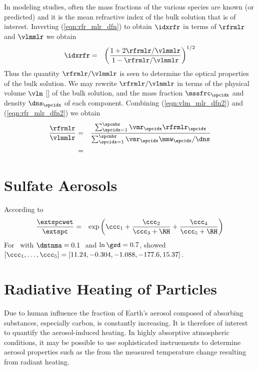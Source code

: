 \documentclass[12pt,twoside]{book}
\begin{document}
In modeling studies, often the mass fractions of the various species
are known (or predicted) and it is the mean refractive index of the
bulk solution that is of interest. 
Inverting (\ref{eqn:rfr_mlr_dfn}) to obtain $\idxrfr$ in terms of
$\rfrmlr$ and $\vlmmlr$ we obtain
\begin{eqnarray}
\idxrfr & = & \left(
\frac{1 + 2 \rfrmlr / \vlmmlr}{1 - \rfrmlr / \vlmmlr} \right)^{1/2}
\label{eqn:idx_rfr_pmr_dfn}
\end{eqnarray}
Thus the quantity $\rfrmlr / \vlmmlr$ is seen to determine the
optical properties of the bulk solution.
We may rewrite $\rfrmlr / \vlmmlr$ in terms of the physical volume
$\vlm$ [\kgxmC] of the bulk solution, and the mass fraction
$\mssfrc_{\spcidx}$ and density $\dns_{\spcidx}$ of each component.
Combining (\ref{eqn:vlm_mlr_dfn2}) and (\ref{eqn:rfr_mlr_dfn2}) we
obtain
\begin{eqnarray}
\frac{\rfrmlr}{\vlmmlr} 
& = & 
\frac{\sum_{\spcidx = 1}^{\spcnbr} \vmr_{\spcidx} \rfrmlr_{\spcidx} }
 { \sum_{\spcidx = 1}^{\spcnbr} \vmr_{\spcidx} \mmw_{\spcidx} / \dns }
\nonumber \\
& = & 
\label{eqn:rfr_ovr_vlm_dfn}
\end{eqnarray}

\section[Sulfate Aerosols]{Sulfate Aerosols}\label{sxn:idx_rfr_SO4}
According to \cite[]{KSR00}
\begin{eqnarray}
\frac{\extspcwet}{\extspc} & = & 
\exp \left( \ccc_{1} + \frac{\ccc_{2}}{\ccc_{3} + \RH} + \frac{\ccc_{4}}{
\ccc_{5} + \RH} \right)
\label{eqn:hyg_grw_SO4_pzn}
\end{eqnarray}
For \HdSOq\ with $\dmtnma = 0.1$\,\um\ and $\ln \gsd = 0.7$, 
\cite{KSR00} showed $[\ccc_{1}, \ldots, \ccc_{5}] =
[11.24,-0.304,-1.088,-177.6,15.37]$. 

\section[Radiative Heating of Particles]{Radiative Heating of Particles}\label{sxn:prt_htg}
Due to human influence the fraction of Earth's aerosol composed of
absorbing substances, especially carbon, is constantly increasing.
It is therefore of interest to quantify the aerosol-induced heating.
In highly absorptive atmospheric conditions, it may be possible
to use sophisticated instruements to determine aerosol properties such
as the  from the measured temperature
change resulting from radiant heating. 
\end{document}
